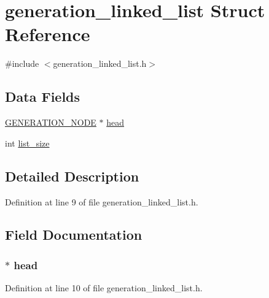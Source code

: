 \hypertarget{structgeneration__linked__list}{}\section{generation\+\_\+linked\+\_\+list Struct Reference}
\label{structgeneration__linked__list}


{\ttfamily \#include $<$generation\+\_\+linked\+\_\+list.\+h$>$}

\subsection*{Data Fields}
\begin{DoxyCompactItemize}
\item 
\hyperlink{generation__node_8h_ac6cb55c16eb08045f92ddabb6785daec}{G\+E\+N\+E\+R\+A\+T\+I\+O\+N\+\_\+\+N\+O\+D\+E} $\ast$ \hyperlink{structgeneration__linked__list_ae12b0bde62cc8abb3f3e91627a26960b}{head}
\item 
int \hyperlink{structgeneration__linked__list_a51695a823cbcb573d6cf50043a5adb1a}{list\+\_\+size}
\end{DoxyCompactItemize}


\subsection{Detailed Description}


Definition at line 9 of file generation\+\_\+linked\+\_\+list.\+h.



\subsection{Field Documentation}
\hypertarget{structgeneration__linked__list_ae12b0bde62cc8abb3f3e91627a26960b}{}
\subsubsection[{head}]{$\ast$ head}\label{structgeneration__linked__list_ae12b0bde62cc8abb3f3e91627a26960b}


Definition at line 10 of file generation\+\_\+linked\+\_\+list.\+h.

